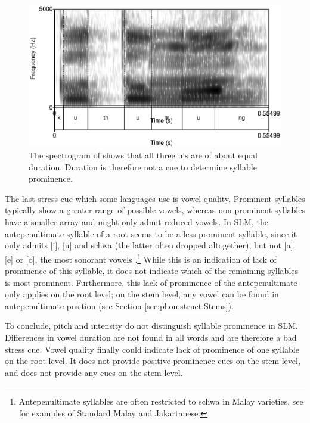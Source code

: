 \begin{figure}
 \centering
\includegraphics{pics/kuthumung-spectro.eps}
 \caption[Duration of vowels in ]{The spectrogram of  shows that all three u's are of about equal duration. Duration is therefore not a cue to determine syllable prominence.}
\label{fig:kuthumungspectro}
\end{figure}


The last stress cue which some languages use is vowel quality. Prominent syllables typically show a greater range of possible vowels, whereas non-prominent syllables have a smaller array and might only admit reduced vowels. In SLM, the antepenultimate syllable  of a root seems to be a less prominent syllable, since it only admits  [i], [u] and schwa (the latter often dropped altogether), but not [a], [e] or [o], the most sonorant vowels \citep{Jespersen1904,Selkirk1984,Clements1990sonority}.\footnote{Antepenultimate syllables are often restricted to schwa in Malay varieties, see \citet[12,31,59]{Adelaar1985} for examples of Standard Malay and Jakartanese.} While this is an indication of lack of prominence of this syllable, it does not indicate which of the remaining syllables is most prominent. Furthermore, this lack of prominence of the antepenultimate only applies on the root level; on the stem level, any vowel can be found in antepenultimate position (see Section \ref{sec:phon:struct:Stems}).

To conclude, pitch and intensity do not distinguish syllable prominence in SLM. Differences in vowel duration are not found in all words and are therefore a bad stress cue. Vowel quality finally could indicate lack of prominence of one syllable on the root level. It does not provide positive prominence cues on the stem level, and does not provide any cues on the stem level.


